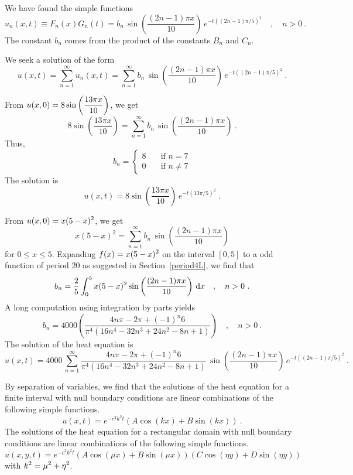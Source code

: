 \begin{egg}
We have found the simple functions
\[
u_n(x,t) \equiv F_n(x)G_n(t) = b_n\,\sin\left(\frac{(2n-1)\pi x}{10}\right)
\, e^{-t ((2n-1)\pi/5)^2} \quad , \quad n > 0 \ .
\]
The constant $b_n$ comes from the product of the constants $B_n$ and
$C_n$.

We seek a solution of the form
\[
u(x,t) = \sum_{n=1}^\infty u_n(x,t)
= \sum_{n=1}^\infty b_n\,\sin\left(\frac{(2n-1)\pi x}{10}\right)
\, e^{-t ((2n-1)\pi/5)^2} \  .
\]

 From
$\displaystyle u(x,0) = 8 \sin\left(\frac{13\pi x}{10}\right)$,
we get
\[
8 \sin\left(\frac{13\pi x}{10}\right)
= \sum_{n=1}^\infty b_n\,\sin\left(\frac{(2n-1)\pi x}{10}\right) \  .
\]
Thus,
\[
b_n =
\begin{cases}
8 & \quad \text{if $n=7$} \\
0 & \quad \text{if $n\neq 7$}
\end{cases}
\]
The solution is
\[
u(x,t) = 8 \sin\left(\frac{13 \pi x}{10}\right)
\, e^{-t (13\pi/5)^2} \  .
\]

 From $\displaystyle u(x,0) = x(5-x)^2$, we get
\[
x(5-x)^2 = \sum_{n=1}^\infty b_n\,\sin\left(\frac{(2n-1)\pi x}{10}\right)
\]
for $0\leq x\leq 5$.  Expanding $\displaystyle f(x) = x(5-x)^2$ on the interval
$[0,5]$ to a odd function of period $20$ as suggested in
Section~\ref{period4L}, we find that
\[
b_n = \frac{2}{5} \int_0^5 x(5-x)^2
\sin\left(\frac{(2n-1)\pi x}{10}\right) \dx{x} \quad , \quad n>0 \ .
\]
A long computation using integration by parts yields
\[
b_n = 4000\left( \frac{4n\pi - 2\pi + (-1)^n 6}
{\pi^4(16n^4 -32 n^3 +24 n^2 -8n +1)}\right) \quad , \quad n > 0 \ .
\]
The solution of the heat equation is
\[
u(x,t) = 
4000\, \sum_{n=1}^\infty \frac{4n\pi - 2\pi + (-1)^n 6}
{\pi^4(16n^4 -32 n^3 +24 n^2 -8n +1)} \,
\sin\left(\frac{(2n-1)\pi x}{10}\right)\, e^{-t ((2n-1)\pi/5)^2} \  .
\]
\end{egg}

\begin{rmk}
By separation of variables, we find that the solutions of the heat
equation for a finite interval with null boundary 
conditions are linear combinations of the following simple functions.
\[
u(x,t) = e^{-c^2 k^2 t}(A \cos (kx) + B \sin(kx)) \ .
\]
The solutions of the heat equation for a rectangular domain with
null boundary conditions are linear combinations of the following
simple functions.
\[
u(x,y,t) = e^{-c^2 k^2 t}(A \cos (\mu x) +B \sin (\mu x))
(C \cos (\eta y) + D \sin (\eta y))
\]
with $\displaystyle k^2 = \mu^2 + \eta^2$.
\end{rmk}

